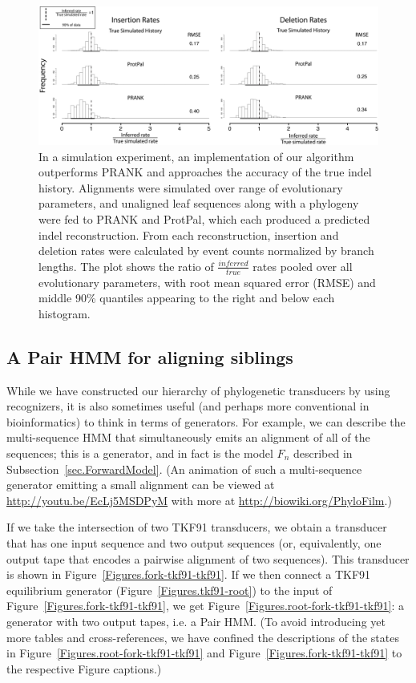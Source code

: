 \documentclass{article}
\newcommand{\secref}[1]{Subsection~\ref{sec.#1}}
\newcommand{\figref}[1]{Figure~\ref{Figures.#1}}
\newcommand{\figlabel}[1]{\label{Figures.#1}}
\begin{document}
\begin{center}
\begin{figure}[h!]
\includegraphics[width=1\textwidth]{estimates_biases_condensed.png}
\caption{In a  simulation experiment, an implementation of our algorithm
outperforms PRANK \cite{LoytynojaGoldman2008} and approaches the accuracy of the true indel history.
Alignments were simulated over range of evolutionary parameters, and unaligned leaf sequences
along with a phylogeny were fed to PRANK and ProtPal, which each produced a predicted indel 
reconstruction. From each reconstruction, insertion and deletion rates were calculated by event
counts normalized by branch lengths.  The plot shows the ratio of $\frac{inferred}{true}$ rates
pooled over all evolutionary parameters, with root mean squared error (RMSE) and middle 90\% 
quantiles appearing to the right and below each histogram. 
 }
\figlabel{estimates_biases_condensed}
\end{figure}
\end{center}



\subsection{A Pair HMM for aligning siblings}

While we have constructed our hierarchy of phylogenetic transducers by using recognizers,
it is also sometimes useful (and perhaps more conventional in bioinformatics) to think in terms of generators.
For example, we can describe the multi-sequence HMM that simultaneously emits an alignment of all of the sequences;
this is a generator, and in fact is the model $F_n$ described in \secref{ForwardModel}.
(An animation of such a multi-sequence generator emitting a small alignment can be viewed at
\url{http://youtu.be/EcLj5MSDPyM} with more at \url{http://biowiki.org/PhyloFilm}.)

If we take the intersection of two TKF91 transducers, we obtain a transducer that has one input sequence and two output sequences
(or, equivalently, one output tape that encodes a pairwise alignment of two sequences).
This transducer is shown in \figref{fork-tkf91-tkf91}.
If we then connect a TKF91 equilibrium generator (\figref{tkf91-root}) to the input of \figref{fork-tkf91-tkf91},
we get \figref{root-fork-tkf91-tkf91}: a generator with two output tapes, i.e. a Pair HMM.
(To avoid introducing yet more tables and cross-references, we have confined the descriptions
 of the states in \figref{root-fork-tkf91-tkf91} and \figref{fork-tkf91-tkf91}
 to the respective Figure captions.)
\end{document}
